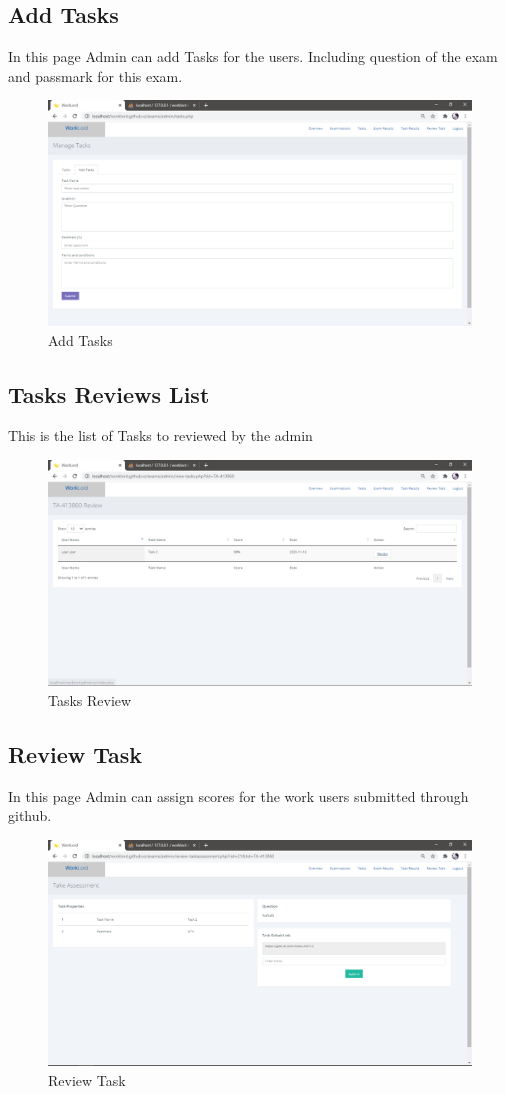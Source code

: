 \documentclass[a4paper,12pt]{report}
\begin{document}
\subsection {Add Tasks}
In this page Admin can add Tasks for the users. Including question of the exam and passmark for this exam.
\begin{figure}[bph]
	\centering
	\includegraphics[width=.7\linewidth ]{img/screenshots/admin/addtasks}
	\caption{Add Tasks}
\end{figure}

\pagebreak


\subsection {Tasks Reviews List}
This is the list of Tasks to reviewed by the admin
\begin{figure}[bph]
	\centering
	\includegraphics[width=.7\linewidth ]{img/screenshots/admin/task_review2}
	\caption{Tasks Review}
\end{figure}

\subsection {Review Task}
In this page Admin can assign scores for the work users submitted through github.
\begin{figure}[bph]
	\centering
	\includegraphics[width=.7\linewidth ]{img/screenshots/admin/task_review3}
	\caption{Review Task}
\end{figure}
\end{document}

